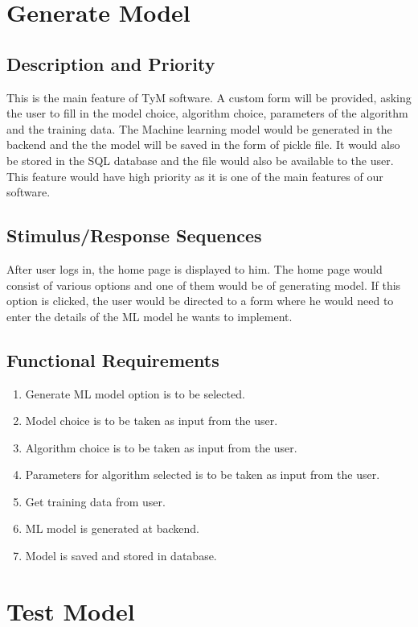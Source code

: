 \documentclass{scrreprt}
\begin{document}
\section{Generate Model}

\subsection{Description and Priority}
This is the main feature of TyM software. A custom form will be provided, asking the user to fill in the model choice, algorithm choice, parameters of the algorithm and the training data. The Machine learning model would be generated in the backend and the the model will be saved in the form of pickle file. It would also be stored in the SQL database and the file would also be available to the user. This feature would have high priority as it is one of the main features of our software.

\subsection{Stimulus/Response Sequences}
After user logs in, the home page is displayed to him. The home page would consist of various options and one of them would be of generating model. If this option is clicked, the user would be directed to a form where he would need to enter the details of the ML model he wants to implement.  

\subsection{Functional Requirements}
\begin{enumerate}
\item Generate ML model option is to be selected.
\item Model choice is to be taken as input from the user.
\item Algorithm choice is to be taken as input from the user.
\item Parameters for algorithm selected is to be taken as input from the user.
\item Get training data from user.
\item ML model is generated at backend.
\item Model is saved and stored in database.
\end{enumerate}

\section{Test Model}
\end{document}
